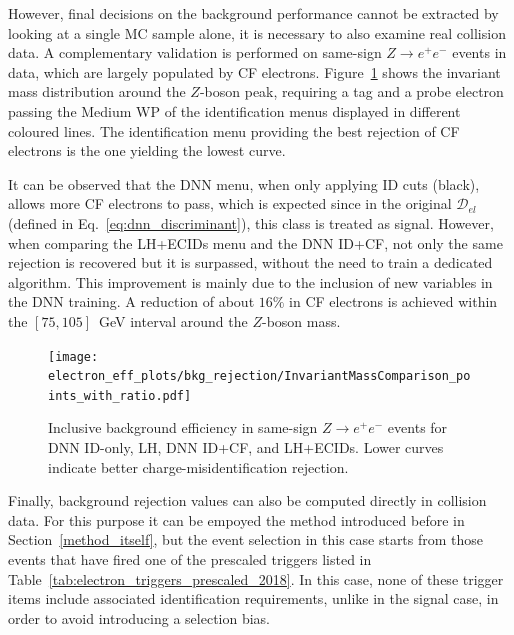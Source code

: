 
However, final decisions on the background performance cannot be extracted by looking at a single MC sample alone, it is necessary to also examine real collision data. A complementary validation is performed on same-sign $Z\to e^{+}e^{-}$ events in data, which are largely populated by CF electrons. Figure~\ref{fig:cf_bkg_data} shows the invariant mass distribution around the $Z$-boson peak, requiring a tag and a probe electron passing the Medium WP of the identification menus displayed in different coloured lines. The identification menu providing the best rejection of CF electrons is the one yielding the lowest curve. 

It can be observed that the DNN menu, when only applying ID cuts (black), allows more CF electrons to pass, which is expected since in the original $\mathcal{D}_{el}$ (defined in Eq.~\ref{eq:dnn_discriminant}), this class is treated as signal. However, when comparing the LH+ECIDs menu and the DNN ID+CF, not only the same rejection is recovered but it is surpassed, without the need to train a dedicated algorithm. This improvement is mainly due to the inclusion of new variables in the DNN training. A reduction of about $16\%$ in CF electrons is achieved within the $[75,105]$~GeV interval around the $Z$-boson mass.

\begin{figure}[htbp]
  \centering
  \texttt{[image: electron\_eff\_plots/bkg\_rejection/InvariantMassComparison\_points\_with\_ratio.pdf]}
  \caption{Inclusive background efficiency in same-sign $Z\to e^{+}e^{-}$ events for DNN ID-only, LH, DNN ID+CF, and LH+ECIDs. Lower curves indicate better charge-misidentification rejection.}
  \label{fig:cf_bkg_data}
\end{figure}

Finally, background rejection values can also be computed directly in collision data. 
For this purpose it can be empoyed the \zmass method introduced before in Section~\ref{method_itself}, but the event selection in this case starts from those events that have fired one of the prescaled triggers listed in Table~\ref{tab:electron_triggers_prescaled_2018}.  
In this case, none of these trigger items include associated identification requirements, unlike in the signal case, in order to avoid introducing a selection bias.

